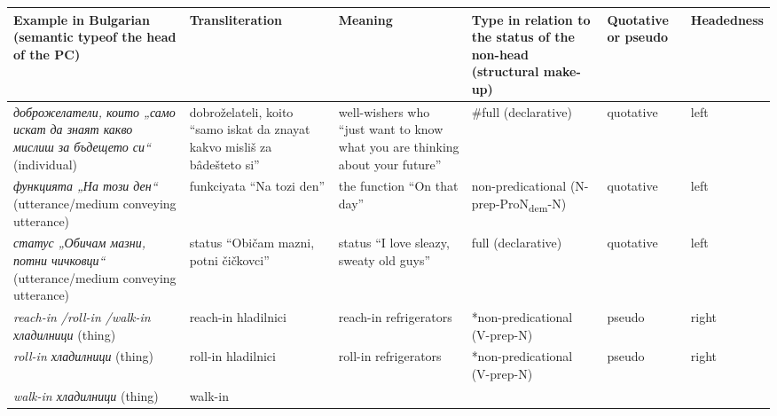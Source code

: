 \documentclass[output=paper]{LSP/langsci}
\begin{document}
\begin{sidewaystable}
\footnotesize
\begin{tabularx}{\textwidth}{QQQQp{1.5cm}l}
\lsptoprule
\textbf{Example in Bulgarian}\footnotemark[4]
\newline 
\textbf{(semantic type}\footnotemark[5] \textbf{of the head of the PC)} & \textbf{Transliteration} & \textbf{Meaning} & \textbf{Type in relation to the  status of the non-head (structural make-up)} & \textbf{Quotative or pseudo} & \textbf{Headedness}\\
\midrule

\textit{{доброжелатели, които „само искат да знаят какво мислиш за бъдещето си“}}
\newline 
(individual) & dobroželateli, koito “samo iskat da znayat kakvo misliš za bâdešteto si” & well-wishers who “just want to know what you are thinking about your future” & \#\footnotemark[8] full 
\newline 
(declarative) & quotative & left\\
{ {{\textit{{функцията „На този ден“}}}}}
\newline 
(utterance\slash medium conveying utterance) & funkciyata “Na tozi den” & the function  “On that day” & non-predicational
\newline 
(N-prep-ProN\textsubscript{dem}-N) & quotative & left\\
\textit{{статус „Обичам мазни, потни чичковци“}}
\newline 
(utterance\slash medium conveying utterance) & status “Običam mazni, potni čičkovci” & status “I love sleazy, sweaty old guys” & full 
\newline 
(declarative) & quotative & left\\
\textit{reach-in \slash  roll-in \slash  walk-in {хладилници}}
\newline 
(thing) & reach-in hladilnici & reach-in refrigerators & *non-predicational
\newline 
(V-prep-N) & pseudo & right\\
\textit{roll-in {хладилници}}
\newline 
(thing) & roll-in
\newline 
hladilnici & roll-in refrigerators & *non-predicational
\newline 
(V-prep-N) & pseudo & right\\
 \textit{walk-in {хладилници}}
\newline 
(thing) & walk-in
\newline 

\end{tabularx}
\end{sidewaystable}
\end{document}
